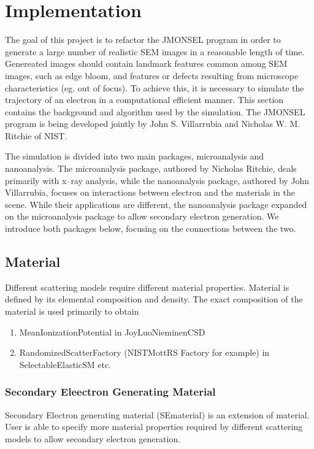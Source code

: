 \chapter{Implementation}\label{impl}
The goal of this project is to refactor the JMONSEL program in order to generate a large number of realistic SEM images in a reasonable length of time. Genereated images should contain landmark features common among SEM images, such as edge bloom, and features or defects resulting from microscope characteristics (eg. out of focus). To achieve this, it is necessary to simulate the trajectory of an electron in a computational efficient manner. This section contains the background and algorithm used by the simulation. The JMONSEL program is being developed jointly by John S. Villarrubia and Nicholas W. M. Ritchie of NIST. 

The simulation is divided into two main packages, microanalysis and nanoanalysis. The microanalysis package, authored by Nicholas Ritchie, deals primarily with x--ray analysis, while the nanoanalysis package, authored by John Villarrubia, focuses on interactions between electron and the materials in the scene. While their applications are different, the nanoanalysis package expanded on the microanalysis package to allow secondary electron generation. We introduce both packages below, focusing on the connections between the two.

\section{Material}\label{impl:material}
Different scattering models require different material properties. Material is defined by its elemental composition and density. The exact composition of the material is used primarily to obtain 
\begin{enumerate}
\item MeanIonizationPotential in JoyLuoNieminenCSD
\item RandomizedScatterFactory (NISTMottRS Factory for example) in SelectableElasticSM etc.
\end{enumerate}

\subsection{Secondary Eleectron Generating Material}\label{subimpl:sematerial}
Secondary Electron generating material (SEmaterial) is an extension of material. User is able to specify more material properties required by different scattering models to allow secondary electron generation. %

